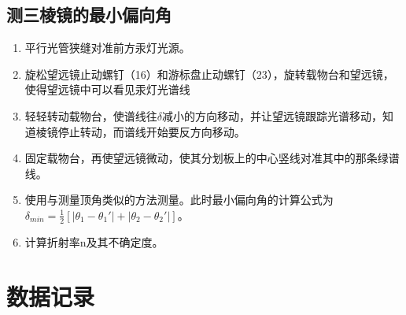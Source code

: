 \documentclass[UTF8]{ctexart}
\begin{document}
\subsection{测三棱镜的最小偏向角}
\begin{enumerate}
    \item 平行光管狭缝对准前方汞灯光源。
    \item 旋松望远镜止动螺钉（16）和游标盘止动螺钉（23），旋转载物台和望远镜，使得望远镜中可以看见汞灯光谱线
    \item 轻轻转动载物台，使谱线往$\delta$减小的方向移动，并让望远镜跟踪光谱移动，知道棱镜停止转动，而谱线开始要反方向移动。
    \item 固定载物台，再使望远镜微动，使其分划板上的中心竖线对准其中的那条绿谱线。
    \item 使用与测量顶角类似的方法测量。此时最小偏向角的计算公式为$\delta_{min}=\frac{1}{2}\left[ | \theta_1-\theta_1'| +| \theta_2-\theta_2'|  \right]$。
    \item 计算折射率n及其不确定度。
\end{enumerate}
\section{数据记录}
\begin{table}[htbp]
    \centering
    \fontsize{8}{10}\selectfont
    \caption{顶角测量}
\end{table}
\begin{table}[htbp]
    \centering
    \fontsize{8}{10}\selectfont
    \caption{最小偏向角测量}
\end{table}
\cite{chen2020tois}
\end{document}

